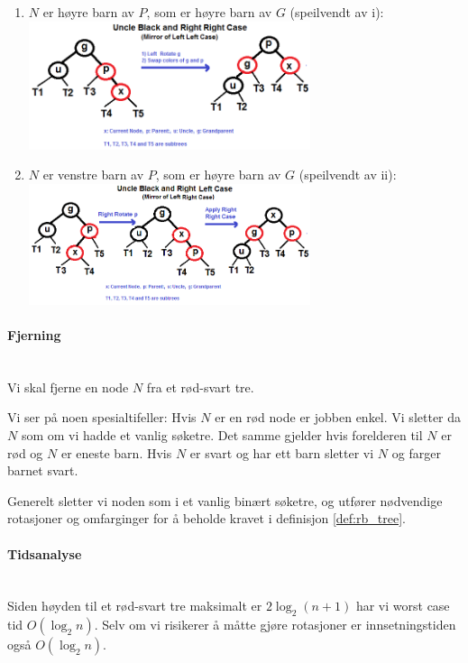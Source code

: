 \begin{teorem}
\begin{enumerate}
\begin{enumerate}
\begin{enumerate}
			\item $ N $ er høyre barn av $ P $, som er høyre barn av $ G $ (speilvendt av i):\\
			\includegraphics[width=0.65\textwidth]{fig/rbt_rr.png}\\
			
			\item $ N $ er venstre barn av $ P $, som er høyre barn av $ G $ (speilvendt av ii):\\
			\includegraphics[width=0.65\textwidth]{fig/rbt_rl.png}\\
			
		\end{enumerate}
	\end{enumerate}
\end{enumerate}
\end{teorem}


\paragraph{Fjerning}~\\
Vi skal fjerne en node $ N $ fra et rød-svart tre.

Vi ser på noen spesialtifeller: Hvis $ N $ er en rød node er jobben enkel. Vi sletter da $ N $ som om vi hadde et vanlig søketre. Det samme gjelder hvis forelderen til $ N $ er rød og $ N $ er eneste barn. Hvis $ N $ er svart og har ett barn sletter vi $ N $ og farger barnet svart. 

Generelt sletter vi noden som i et vanlig binært søketre, og utfører nødvendige rotasjoner og omfarginger for å beholde kravet i definisjon \ref{def:rb_tree}.


\paragraph{Tidsanalyse}~\\
Siden høyden til et rød-svart tre maksimalt er $ 2\log_2 (n+1) $ har vi worst case tid $ O(\log_2 n) $. Selv om vi risikerer å måtte gjøre rotasjoner er innsetningstiden også $ O(\log_2 n) $.


